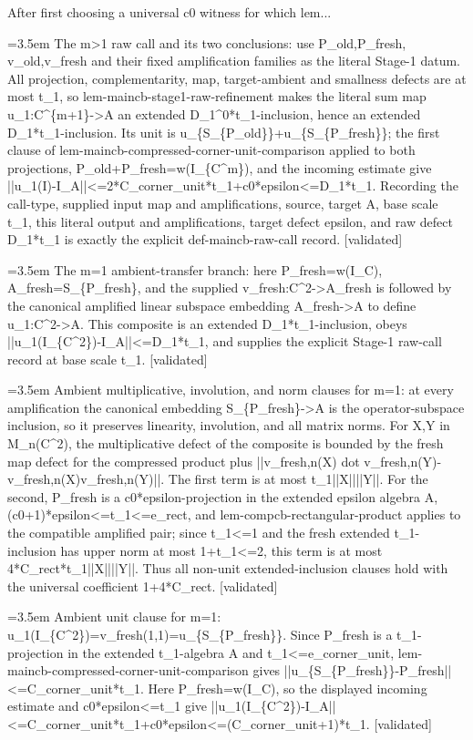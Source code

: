 \documentclass{article}
\newcommand{\step}[1]{\par\noindent\hangindent=3.5em\hangafter=1%
  \makebox[3.5em][l]{\textbf{#1.}}}
\newcommand{\steptag}[1]{\hfill{\small\textsf{[#1]}}}
\begin{document}
\begin{proofbox}{After first choosing a universal c0 witness for which lem...}
\step{1.5} The m>1 raw call and its two conclusions: use P\_old,P\_fresh, v\_old,v\_fresh and their fixed amplification families as the literal Stage-1 datum. All projection, complementarity, map, target-ambient and smallness defects are at most t\_1, so lem-maincb-stage1-raw-refinement makes the literal sum map u\_1:C\textasciicircum{}\{m+1\}->A an extended D\_1\textasciicircum{}0*t\_1-inclusion, hence an extended D\_1*t\_1-inclusion. Its unit is u\_\{S\_\{P\_old\}\}+u\_\{S\_\{P\_fresh\}\}; the first clause of lem-maincb-compressed-corner-unit-comparison applied to both projections, P\_old+P\_fresh=w(I\_\{C\textasciicircum{}m\}), and the incoming estimate give ||u\_1(I)-I\_A||<=2*C\_corner\_unit*t\_1+c0*epsilon<=D\_1*t\_1. Recording the call-type, supplied input map and amplifications, source, target A, base scale t\_1, this literal output and amplifications, target defect epsilon, and raw defect D\_1*t\_1 is exactly the explicit def-maincb-raw-call record. \steptag{validated} \\[4pt]
\step{1.6} The m=1 ambient-transfer branch: here P\_fresh=w(I\_C), A\_fresh=S\_\{P\_fresh\}, and the supplied v\_fresh:C\textasciicircum{}2->A\_fresh is followed by the canonical amplified linear subspace embedding A\_fresh->A to define u\_1:C\textasciicircum{}2->A. This composite is an extended D\_1*t\_1-inclusion, obeys ||u\_1(I\_\{C\textasciicircum{}2\})-I\_A||<=D\_1*t\_1, and supplies the explicit Stage-1 raw-call record at base scale t\_1. \steptag{validated} \\[6pt]
\step{1.6.1} Ambient multiplicative, involution, and norm clauses for m=1: at every amplification the canonical embedding S\_\{P\_fresh\}->A is the operator-subspace inclusion, so it preserves linearity, involution, and all matrix norms. For X,Y in M\_n(C\textasciicircum{}2), the multiplicative defect of the composite is bounded by the fresh map defect for the compressed product plus ||v\_fresh,n(X) dot v\_fresh,n(Y)-v\_fresh,n(X)v\_fresh,n(Y)||. The first term is at most t\_1||X||||Y||. For the second, P\_fresh is a c0*epsilon-projection in the extended epsilon algebra A, (c0+1)*epsilon<=t\_1<=e\_rect, and lem-compcb-rectangular-product applies to the compatible amplified pair; since t\_1<=1 and the fresh extended t\_1-inclusion has upper norm at most 1+t\_1<=2, this term is at most 4*C\_rect*t\_1||X||||Y||. Thus all non-unit extended-inclusion clauses hold with the universal coefficient 1+4*C\_rect. \steptag{validated} \\[4pt]
\step{1.6.2} Ambient unit clause for m=1: u\_1(I\_\{C\textasciicircum{}2\})=v\_fresh(1,1)=u\_\{S\_\{P\_fresh\}\}. Since P\_fresh is a t\_1-projection in the extended t\_1-algebra A and t\_1<=e\_corner\_unit, lem-maincb-compressed-corner-unit-comparison gives ||u\_\{S\_\{P\_fresh\}\}-P\_fresh||<=C\_corner\_unit*t\_1. Here P\_fresh=w(I\_C), so the displayed incoming estimate and c0*epsilon<=t\_1 give ||u\_1(I\_\{C\textasciicircum{}2\})-I\_A||<=C\_corner\_unit*t\_1+c0*epsilon<=(C\_corner\_unit+1)*t\_1. \steptag{validated} \\[4pt]

\end{proofbox}
\end{document}
